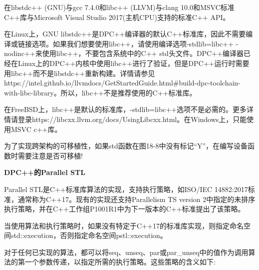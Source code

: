 在libstdc++ (GNU)与gcc 7.4.0和libc++ (LLVM)与clang 10.0和MSVC标准C++库与Microsoft Visual Studio 2017(主机CPU)支持的标准C++ API。\par

在Linux上，GNU libstdc++是DPC++编译器的默认C++标准库，因此不需要编译或链接选项。如果我们想要使用libc++，请使用编译选项-stdlib=libc++ -nodinc++来使用libc++，不要包含系统中的C++ std头文件。DPC++编译器已经在Linux上的DPC++内核中使用libc++进行了验证，但是DPC++运行时需要用libc++而不是libstdc++重新构建。详情请参见https://intel.github.io/llvmdocs/GetStartedGuide.html\#build-dpc-toolchain-with-libc-library。所以，libc++不是推荐使用的C++标准库。\par

在FreeBSD上，libc++是默认的标准库，-stdlib=libc++选项不是必需的。更多详情请登录https://libcxx.llvm.org/docs/UsingLibcxx.html。在Windows上，只能使用MSVC c++库。\par

\begin{tcolorbox}[colback=red!5!white,colframe=red!75!black]
为了实现跨架构的可移植性，如果std函数在图18-8中没有标记“Y”，在编写设备函数时需要注意是否可移植!
\end{tcolorbox}

\hspace*{\fill} \par %
\textbf{DPC++的Parallel STL}

Parallel STL是C++标准库算法的实现，支持执行策略，如ISO/IEC 14882:2017标准，通常称为C++17。现有的实现还支持Parallelism TS version 2中指定的未排序执行策略，并在C++工作组P1001R1中为下一版本的C++标准提出了该策略。\par

当使用算法和执行策略时，如果没有特定于C++17的标准库实现，则指定命名空间std::execution，否则指定命名空间pstl::execution。\par

对于任何已实现的算法，都可以将seq、unseq、par或par\_unseq中的值作为调用算法的第一个参数传递，以指定所需的执行策略。这些策略的含义如下:\par

